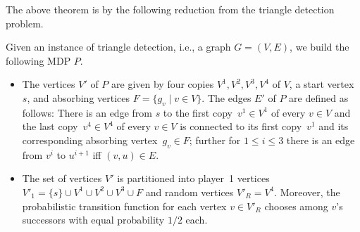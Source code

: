 \documentclass[11pt,letterpaper]{article}
\newcommand{\mdp}{P\xspace}
\begin{document}
The above theorem is by the following reduction from the triangle detection problem.
\begin{reduction}\label{red:TriangletoMDPReach}
 Given an instance of triangle detection, i.e., a graph $G=(V,E)$,
 we build the following MDP $\mdp$. 
 \begin{itemize}
  \item  The vertices $V'$ of $\mdp$ are given by four copies 
  $V^1, V^2, V^3, V^4$ of $V$, a start vertex~$s$, and absorbing vertices 
  $F=\{g_v \mid v \in V\}$. The edges $E'$ of $\mdp$ are defined as follows:
  There is an edge from $s$ to the first copy~$v^1 \in V^1$ of every $v \in V$ 
  and the last copy~$v^4 \in V^4$ of every $v \in V$ is connected to its first copy~$v^1$
  and its corresponding absorbing vertex~$g_v \in F$; further for $1 \le i \le 3$
  there is an edge from $v^i$ to $u^{i+1}$ iff $(v,u) \in E$.
	  
  \item The set of vertices $V'$ is partitioned into player~1 vertices $V'_1=\{s\} \cup V^1 \cup V^2 \cup V^3\cup F$
	and random vertices $V'_R= V^4$.
	Moreover, the probabilistic transition function for each vertex $v \in V'_R$ 
	chooses among $v$'s successors with equal probability $1/2$ each.
	
 \end{itemize}
\end{reduction}
\end{document}
